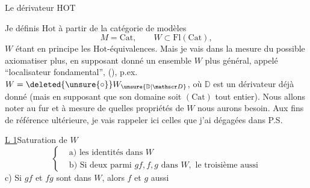 Le dérivateur HOT

Je définis $\mathrm{Hot}$ à partir de la catégorie de
modèles
\[
M=\mathrm{Cat},\qquad W\subset\mathrm{Fl}(\mathrm{Cat}),
\]
$W$ étant en principe les $\mathrm{Hot}$-équivalences. Mais je
vais dans la mesure du possible axiomatiser plus,
en supposant donné un ensemble $W$ plus
général, appelé ``localisateur fondamental'',
(), p.ex. $W=\deleted{\unsure{\circ}}W_{\unsure{\mathbb D|\mathscr D}}$, où $\mathbb D$ est un
dérivateur déjà donné (mais en supposant que
son domaine soit $(\mathrm{Cat})$ tout entier). Nous
allons noter au fur et à mesure de quelles
propriétés de $W$ nous aurons besoin. Aux fins de
référence ultérieure, je vais rappeler ici celles que
j'ai dégagées dans P.S.

\uline{L 1}\quad Saturation de $W$ 
\[
\left\{\begin{aligned}
&\text{a) les identités dans }W\\
&\text{b) Si deux parmi }gf,f,g\text{ dans }W,\text{ le troisième aussi}
\end{aligned}\right.
\]
c) Si $gf$ et $fg$ sont dans $W$, alors $f$ et $g$ aussi

